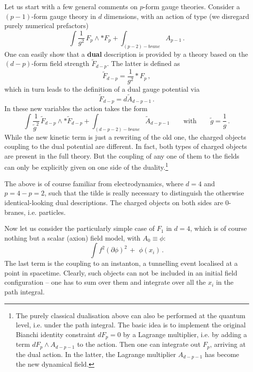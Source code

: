 \documentclass[12pt]{article}
\newcommand{\be}{\begin{equation}}
\newcommand{\ee}{\end{equation}}
\numberwithin{equation}{section}
\begin{document}
Let us start with a few general comments on $p$-form gauge theories. Consider a $(p\!-\!1)$-form gauge theory in $d$ dimensions, with an action of type (we disregard purely numerical prefactors)
\be
\int \frac{1}{g^2}\,F_p\wedge * F_p + \int_{(p-2)-brane} A_{p-1}\,.
\ee
One can easily show that a {\bf dual} description is provided by a theory based on the $(d-p)$-form field strength $\tilde{F}_{d-p}$. The latter is defined as
\be
\tilde{F}_{d-p}=\frac{1}{g^2} * F_p\,,
\ee
which in turn leads to the definition of a dual gauge potential via
\be
\tilde{F}_{d-p}=d\tilde{A}_{d-p-1}\,.
\ee
In these new variables the action takes the form
\be
\int \frac{1}{\tilde{g}^2}\, \tilde{F}_{d-p}\wedge *  \tilde{F}_{d-p} + 
\int_{(d-p-2)-brane} \tilde{A}_{d-p-1}\qquad\mbox{with}\qquad \tilde{g}=\frac{1}{g}\,.
\ee
While the new kinetic term is just a rewriting of the old one, the charged objects coupling to the dual potential are different. In fact, both types of charged objects are present in the full theory. But the coupling of any one of them to the fields can only be explicitly given on one side of the duality.\footnote{
The purely classical dualisation above can also be performed at the quantum level, i.e. under the path integral. The basic idea is to implement the original Bianchi identity constraint $dF_p=0$ by a Lagrange multiplier, i.e. by adding a term $dF_p\wedge A_{d-p-1}$ to the action. Then one can integrate out $F_p$, arriving at the dual action. In the latter, the Lagrange multiplier $A_{d-p-1}$ has become the new dynamical field.}

The above is of course familiar from electrodynamics, where $d=4$ and $p=4-p=2$, such that the tilde is really necessary to distinguish the otherwise identical-looking dual descriptions. The charged objects on both sides are 0-branes, i.e. particles. 

Now let us consider the particularly simple case of $F_1$ in $d=4$, which is of course nothing but a scalar (axion) field model, with $A_0\equiv \phi$:
\be
\int f^2 (\partial \phi)^2\,+\,\,\phi(x_i)\,.\label{imo}
\ee
The last term is the coupling to an instanton, a tunnelling event localised at a point in spacetime. Clearly, such objects can not be included in an initial field configuration -- one has to sum over them and integrate over all the $x_i$ in the path integral. 
\end{document}
